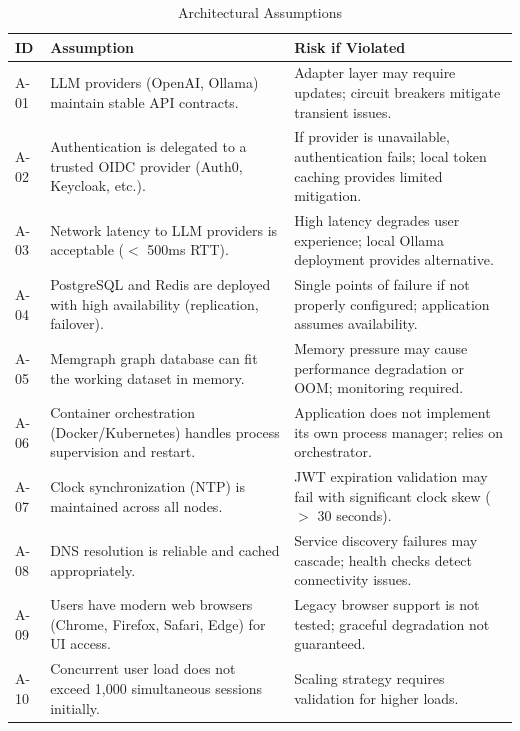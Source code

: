 \documentclass[a4paper,twoside]{sapthesis}
\begin{document}
\begin{table}[htbp]
\centering
\caption{Architectural Assumptions}
\label{tab:assumptions}
\small
\begin{tabularx}{\textwidth}{p{0.8cm}Xp{4.5cm}}
\toprule
\textbf{ID} & \textbf{Assumption} & \textbf{Risk if Violated} \\
\midrule
A-01 & LLM providers (OpenAI, Ollama) maintain stable API contracts. & Adapter layer may require updates; circuit breakers mitigate transient issues. \\
\midrule
A-02 & Authentication is delegated to a trusted OIDC provider (Auth0, Keycloak, etc.). & If provider is unavailable, authentication fails; local token caching provides limited mitigation. \\
\midrule
A-03 & Network latency to LLM providers is acceptable ($<$ 500ms RTT). & High latency degrades user experience; local Ollama deployment provides alternative. \\
\midrule
A-04 & PostgreSQL and Redis are deployed with high availability (replication, failover). & Single points of failure if not properly configured; application assumes availability. \\
\midrule
A-05 & Memgraph graph database can fit the working dataset in memory. & Memory pressure may cause performance degradation or OOM; monitoring required. \\
\midrule
A-06 & Container orchestration (Docker/Kubernetes) handles process supervision and restart. & Application does not implement its own process manager; relies on orchestrator. \\
\midrule
A-07 & Clock synchronization (NTP) is maintained across all nodes. & JWT expiration validation may fail with significant clock skew ($>$ 30 seconds). \\
\midrule
A-08 & DNS resolution is reliable and cached appropriately. & Service discovery failures may cascade; health checks detect connectivity issues. \\
\midrule
A-09 & Users have modern web browsers (Chrome, Firefox, Safari, Edge) for UI access. & Legacy browser support is not tested; graceful degradation not guaranteed. \\
\midrule
A-10 & Concurrent user load does not exceed 1,000 simultaneous sessions initially. & Scaling strategy requires validation for higher loads. \\
\bottomrule
\end{tabularx}
\end{table}
\end{document}
